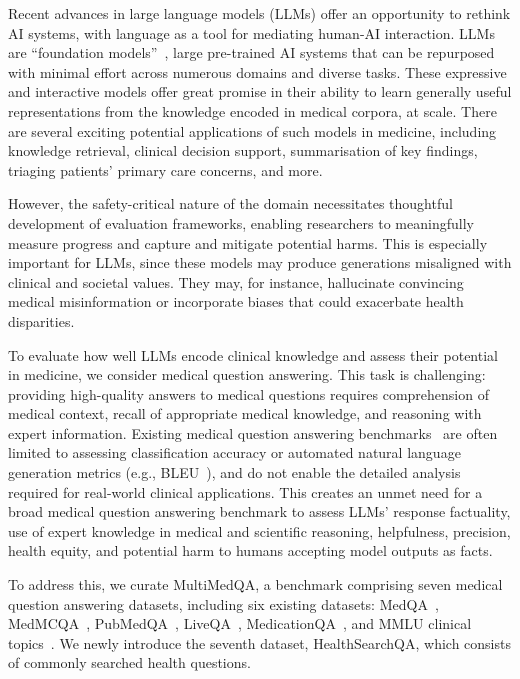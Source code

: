 Recent advances in large language models (LLMs) offer an opportunity to rethink AI systems, with language as a tool for mediating human-AI interaction. LLMs are “foundation models”~\cite{bommasani2021opportunities}, large pre-trained AI systems that can be repurposed with minimal effort across numerous domains and diverse tasks. These expressive and interactive models offer great promise in their ability to learn generally useful representations from the knowledge encoded in medical corpora, at scale. There are several exciting potential applications of such models in medicine, including knowledge retrieval, clinical decision support, summarisation of key findings, triaging patients’ primary care concerns, and more.

However, the safety-critical nature of the domain necessitates thoughtful development of evaluation frameworks, enabling researchers to meaningfully measure progress and capture and mitigate potential harms. This is especially important for LLMs, since these models may produce generations misaligned with clinical and societal values. They may, for instance, hallucinate convincing medical misinformation or incorporate biases that could exacerbate health disparities.

To evaluate how well LLMs encode clinical knowledge and assess their potential in medicine, we consider medical question answering. This task is challenging: providing high-quality answers to medical questions requires comprehension of medical context, recall of appropriate medical knowledge, and reasoning with expert information. Existing medical question answering benchmarks~\cite{jin2021disease} are often limited to assessing classification accuracy or automated natural language generation metrics (e.g., BLEU~\cite{papineni2002bleu}), and do not enable the detailed analysis required for real-world clinical applications. This creates an unmet need for a broad medical question answering benchmark to assess LLMs’ response factuality, use of expert knowledge in medical and scientific reasoning, helpfulness, precision, health equity, and potential harm to humans accepting model outputs as facts.  

To address this, we curate MultiMedQA, a benchmark comprising seven medical question answering datasets, including six existing datasets: MedQA~\cite{jin2021disease}, MedMCQA~\cite{pal2022medmcqa}, PubMedQA~\cite{jin2019pubmedqa}, LiveQA~\cite{abacha2017overview}, MedicationQA~\cite{abacha2019bridging}, and MMLU clinical topics~\cite{hendrycks2020measuring}. We newly introduce the seventh dataset, HealthSearchQA, which consists of commonly searched health questions.

